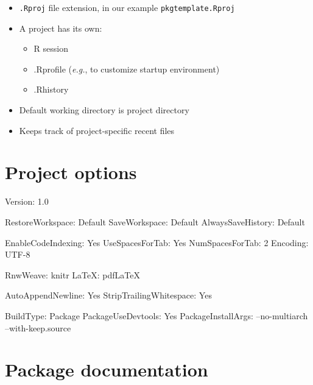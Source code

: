 \documentclass[]{book}
\newenvironment{Shaded}{\begin{snugshade}}{\end{snugshade}}
\newcommand{\DecValTok}[1]{\textcolor[rgb]{0.00,0.00,0.81}{{#1}}}
\newcommand{\FloatTok}[1]{\textcolor[rgb]{0.00,0.00,0.81}{{#1}}}
\newcommand{\StringTok}[1]{\textcolor[rgb]{0.31,0.60,0.02}{{#1}}}
\newcommand{\NormalTok}[1]{{#1}}
\providecommand{\tightlist}{%
  \setlength{\itemsep}{0pt}\setlength{\parskip}{0pt}}
\theoremstyle{definition}
\theoremstyle{definition}
\theoremstyle{definition}
\theoremstyle{remark}
\begin{document}
\begin{itemize}
\item
  \texttt{.Rproj} file extension, in our example
  \texttt{pkgtemplate.Rproj}
\item
  A project has its own:

  \begin{itemize}
  \tightlist
  \item
    R session
  \item
    .Rprofile (\emph{e.g.}, to customize startup environment)
  \item
    .Rhistory
  \end{itemize}
\item
  Default working directory is project directory
\item
  Keeps track of project-specific recent files
\end{itemize}

\section{Project options}\label{project-options}

\begin{Shaded}
\begin{Highlighting}[]
\NormalTok{Version:}\StringTok{ }\FloatTok{1.0}

\NormalTok{RestoreWorkspace:}\StringTok{ }\NormalTok{Default}
\NormalTok{SaveWorkspace:}\StringTok{ }\NormalTok{Default}
\NormalTok{AlwaysSaveHistory:}\StringTok{ }\NormalTok{Default}

\NormalTok{EnableCodeIndexing:}\StringTok{ }\NormalTok{Yes}
\NormalTok{UseSpacesForTab:}\StringTok{ }\NormalTok{Yes}
\NormalTok{NumSpacesForTab:}\StringTok{ }\DecValTok{2}
\NormalTok{Encoding:}\StringTok{ }\NormalTok{UTF}\DecValTok{-8}

\NormalTok{RnwWeave:}\StringTok{ }\NormalTok{knitr}
\NormalTok{LaTeX:}\StringTok{ }\NormalTok{pdfLaTeX}

\NormalTok{AutoAppendNewline:}\StringTok{ }\NormalTok{Yes}
\NormalTok{StripTrailingWhitespace:}\StringTok{ }\NormalTok{Yes}

\NormalTok{BuildType:}\StringTok{ }\NormalTok{Package}
\NormalTok{PackageUseDevtools:}\StringTok{ }\NormalTok{Yes}
\NormalTok{PackageInstallArgs:}\StringTok{ }\NormalTok{--no-multiarch --with-keep.source}
\end{Highlighting}
\end{Shaded}

\section{Package documentation}\label{package-documentation}
\end{document}
